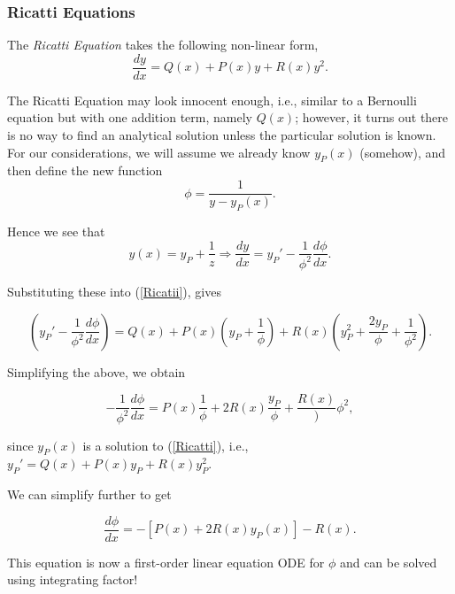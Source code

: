 %
% 
\subsubsection{Ricatti Equations}

The \emph{Ricatti Equation} takes the following non-linear form,
\begin{equation}
\label{Ricatti} \frac{dy}{dx} = Q(x) + P(x)y + R(x)y^2.
\end{equation}

The Ricatti Equation may look innocent enough, i.e., similar to a Bernoulli equation but with one addition term, namely $Q(x)$; however, it turns out there is no way to find an analytical solution unless the particular solution is known. For our considerations, we will assume we already know $y_P(x)$ (somehow), and then define the new function
\begin{equation}
\label{ricattio_sub} \phi = \frac{1}{y - y_P(x)}.
\end{equation}

Hence we see that $$y(x) = y_P + \frac{1}{z} \Rightarrow \frac{dy}{dx} = y_P' - \frac{1}{\phi^2} \frac{d\phi}{dx}.$$

Substituting these into (\ref{Ricatii}), gives

$$\left( y_P' - \frac{1}{\phi^2} \frac{d\phi}{dx} \right) = Q(x) + P(x) \left( y_P + \frac{1}{\phi} \right)+ R(x) \left(y_P^2 + \frac{2y_P}{\phi} + \frac{1}{\phi^2} \right).$$

Simplifying the above, we obtain

$$-\frac{1}{\phi^2} \frac{d\phi}{dx} = P(x) \frac{1}{\phi} + 2R(x)\frac{y_P}{\phi} + \frac{R(x)}){\phi^2},$$

since $y_P(x)$ is a solution to (\ref{Ricatti}), i.e., $y_P' = Q(x) + P(x)y_P + R(x) y_P^2.$

We can simplify further to get

$$\frac{d\phi}{dx} = -\left[ P(x) + 2R(x) y_P(x) \right] - R(x).$$

This equation is now a first-order linear equation ODE for $\phi$ and can be solved using integrating factor!

